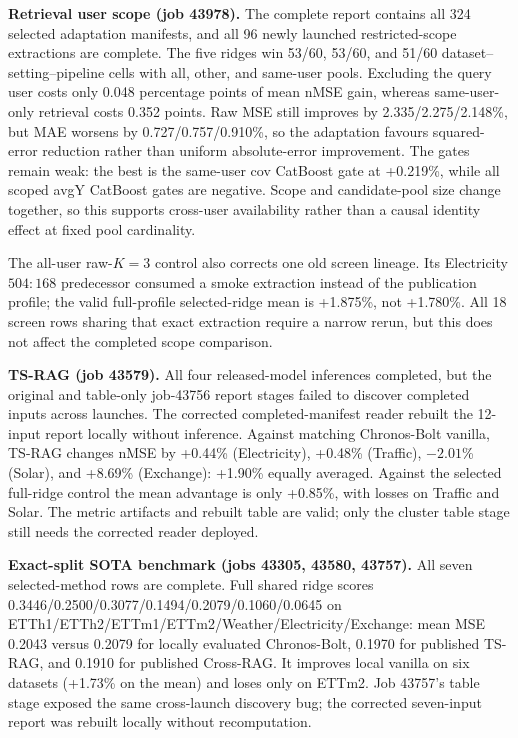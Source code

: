 \documentclass[10pt,a4paper]{article}
\newcommand{\sectionbar}[1]{\vspace{2pt}{\large\bfseries\color{navy}#1}\par\vspace{2pt}\color{black}}
\begin{document}
\vspace{4pt}
\sectionbar{Completed follow-ups}
\scriptsize
\textbf{Retrieval user scope (job 43978).} The complete report contains all 324
selected adaptation manifests, and all 96 newly launched restricted-scope
extractions are complete. The five ridges win 53/60, 53/60, and 51/60
dataset--setting--pipeline cells with all, other, and same-user pools. Excluding
the query user costs only 0.048 percentage points of mean nMSE gain, whereas
same-user-only retrieval costs 0.352 points. Raw MSE still improves by
2.335/2.275/2.148\%, but MAE worsens by 0.727/0.757/0.910\%, so the adaptation
favours squared-error reduction rather than uniform absolute-error improvement.
The gates remain weak: the best is the same-user cov CatBoost gate at +0.219\%,
while all scoped avgY CatBoost gates are negative. Scope and candidate-pool size
change together, so this supports cross-user availability rather than a causal
identity effect at fixed pool cardinality.

The all-user raw-$K=3$ control also corrects one old screen lineage. Its
Electricity $504{:}168$ predecessor consumed a smoke extraction instead of the
publication profile; the valid full-profile selected-ridge mean is +1.875\%,
not +1.780\%. All 18 screen rows sharing that exact extraction require a narrow
rerun, but this does not affect the completed scope comparison.

\textbf{TS-RAG (job 43579).} All four released-model inferences completed, but
the original and table-only job-43756 report stages failed to discover completed
inputs across launches. The corrected completed-manifest reader rebuilt the
12-input report locally without inference. Against matching Chronos-Bolt vanilla,
TS-RAG changes nMSE by +0.44\% (Electricity), +0.48\% (Traffic), $-2.01$\%
(Solar), and +8.69\% (Exchange): +1.90\% equally averaged. Against the selected
full-ridge control the mean advantage is only +0.85\%, with losses on Traffic
and Solar. The metric artifacts and rebuilt table are valid; only the cluster
table stage still needs the corrected reader deployed.

\textbf{Exact-split SOTA benchmark (jobs 43305, 43580, 43757).} All seven
selected-method rows are complete. Full shared ridge scores
0.3446/0.2500/0.3077/0.1494/0.2079/0.1060/0.0645 on
ETTh1/ETTh2/ETTm1/ETTm2/Weather/Electricity/Exchange: mean MSE 0.2043 versus
0.2079 for locally evaluated Chronos-Bolt, 0.1970 for published TS-RAG, and
0.1910 for published Cross-RAG. It improves local vanilla on six datasets
(+1.73\% on the mean) and loses only on ETTm2. Job 43757's table stage exposed
the same cross-launch discovery bug; the corrected seven-input report was
rebuilt locally without recomputation.
\end{document}
